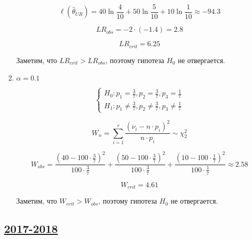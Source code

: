 \begin{enumerate}
\[
\ell(\hat \theta_{UR}) = 40\ln {\frac{4}{10}} + 50\ln {\frac{5}{10}} + 10\ln {\frac{1}{10}} \approx -94.3
\]

\[
LR_{obs} = -2 \cdot (-1.4) = 2.8
\]

\[
LR_{crit} = 6.25
\]
	
Заметим, что $LR_{crit} > LR_{obs}$, поэтому гипотеза $H_0$ не отвергается.

\item
$\alpha = 0.1$
	
\[
\begin{cases}
H_0: p_1 = \frac{3}{7}, p_2 = \frac{3}{7}, p_3 = \frac{1}{7} \\
H_1: p_1 \neq \frac{3}{7}, p_2 \neq \frac{3}{7}, p_3 \neq \frac{1}{7} 
\end{cases}
\]

\[	
W_n = \sum_{i=1}^r\frac{(\nu_i - n \cdot p_i)^2}{n \cdot p_i}\sim \chi_2^2
\]

\[
W_{obs} = \frac{(40 - 100 \cdot \frac{3}{7})^2}{100 \cdot \frac{3}{7}} + \frac{(50 - 100 \cdot \frac{3}{7})^2}{100 \cdot \frac{3}{7}} + \frac{(10 - 100 \cdot \frac{1}{7})^2}{100 \cdot \frac{1}{7}} \approx 2.58 
\]

\[
W_{crit} = 4.61
\]

Заметим, что $W_{crit} > W_{obs}$, поэтому гипотеза $H_0$ не отвергается.	
\end{enumerate} 


\subsection[2017-2018]{\hyperref[sec:kr_04_2017_2018]{2017-2018}}
\label{sec:sol_kr_04_2017_2018}

